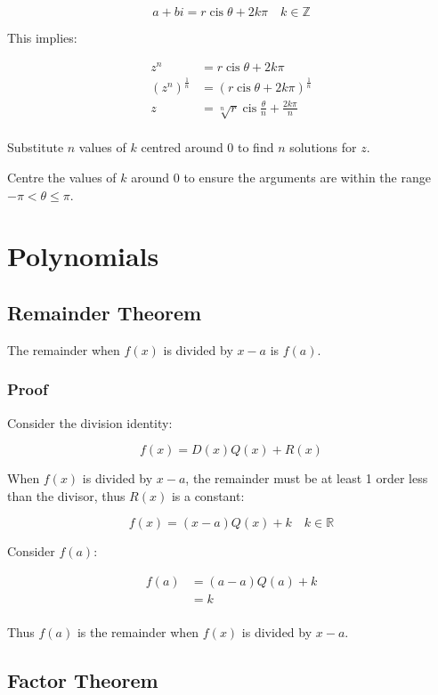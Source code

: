 \documentclass[a4paper,11pt]{article}
\DeclareMathOperator\cis{cis}
\begin{document}
$$
a + bi = r \cis{\theta + 2k\pi} \quad k \in \mathbb{Z}
$$

This implies:

$$
\begin{aligned}
z^n & = r \cis{\theta + 2k\pi} \\
(z^n)^{\frac{1}{n}} & = (r \cis{\theta + 2k\pi})^{\frac{1}{n}} \\
z & = \sqrt[n]{r} \cis{\frac{\theta}{n} + \frac{2k\pi}{n}} \\
\end{aligned}
$$

Substitute $n$ values of $k$ centred around 0 to find $n$ solutions for $z$.

Centre the values of $k$ around 0 to ensure the arguments are within the range
$-\pi < \theta \leq \pi$.




\section{Polynomials}

\subsection{Remainder Theorem}

The remainder when $f(x)$ is divided by $x - a$ is $f(a)$.


\subsubsection{Proof}

Consider the division identity:

$$
f(x) = D(x) Q(x) + R(x)
$$

When $f(x)$ is divided by $x - a$, the remainder must be at least 1 order less
than the divisor, thus $R(x)$ is a constant:

$$
f(x) = (x - a) Q(x) + k \quad k \in \mathbb{R}
$$

Consider $f(a)$:

$$
\begin{aligned}
f(a) & = (a - a) Q(a) + k \\
& = k \\
\end{aligned}
$$

Thus $f(a)$ is the remainder when $f(x)$ is divided by $x - a$.


\subsection{Factor Theorem}
\end{document}
